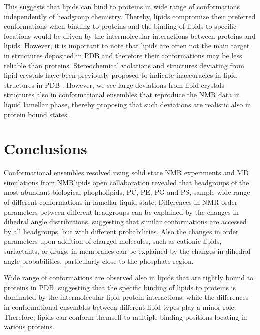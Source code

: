 \documentclass[aps,prl,superscriptaddress,twocolumn]{revtex4}
\begin{document}
This suggests that lipids can bind to proteins in wide range of conformations independently
of headgroup chemistry. Thereby, lipids compromize their preferred conformations when binding
to proteins and the binding of lipids to specific locations would be driven by 
the intermolecular interactions between proteins and lipids.
However, it is important to note that lipids are often not the main target in
structures deposited in PDB and therefore their conformations may be less reliable than proteins.
Stereochemical violations and structures deviating from lipid crystals have been
previously proposed to indicate inaccuracies in lipid structures in PDB \cite{marsh13b,pezeshkian18}. 
However, we see large deviations from lipid crystals structures also in conformational ensembles
that reproduce the NMR data in liquid lamellar phase, thereby proposing that such deviations
are realistic also in protein bound states.

\section{Conclusions}

Conformational ensembles resolved using solid state NMR experiments and MD simulations
from NMRlipids open collaboration revealed that headgroups of the most abundant biological
phopholipids, PC, PE, PG and PS, sample wide range of different conformations in lamellar liquid state.
Differences in NMR order parameters between different headgroups can be explained
by the changes in dihedral angle distributions, suggesting that
similar conformations are accessed by all headgroups, but with different probabilities.
Also the changes in order parameters upon addition of charged molecules, such as cationic lipids, surfactants, or drugs,
in membranes can be explained by the changes in dihedral angle probabilities, particularly close to the phosphate region.

Wide range of conformations are observed also in lipids that are tightly bound to proteins in PDB,
suggesting that the specific binding of lipids to proteins is dominated by the intermolecular lipid-protein
interactions, while the differences in conformational ensembles between different lipid types
play a minor role. Therefore, lipids can conform themself to multiple binding positions locating
in various proteins.
\end{document}
